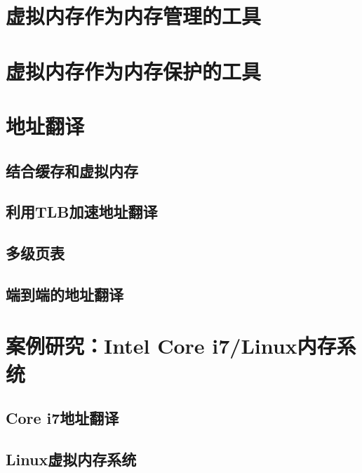 \pending

\section{虚拟内存作为内存管理的工具}

\pending

\section{虚拟内存作为内存保护的工具}

\pending

\section{地址翻译}

\pending

\subsection{结合缓存和虚拟内存}

\pending

\subsection{利用TLB加速地址翻译}

\pending

\subsection{多级页表}

\pending

\subsection{端到端的地址翻译}

\pending

\section{案例研究：Intel Core i7/Linux内存系统}

\pending

\subsection{Core i7地址翻译}

\pending

\subsection{Linux虚拟内存系统}

